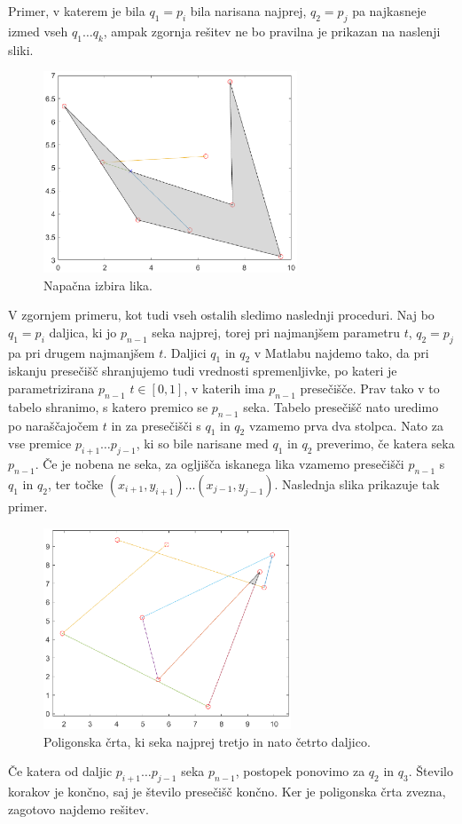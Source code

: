 \documentclass{article}
\begin{document}
Primer, v katerem je bila $q_1 = p_i$ bila narisana najprej, $q_2 = p_j$ pa najkasneje izmed vseh $q_1 \dots q_k$, ampak 
zgornja rešitev ne bo pravilna je prikazan na naslenji sliki.
\begin{figure}[H]
    \centering
        \includegraphics[height = 6cm]{tocke_v_testu.eps}
        \caption{Napačna izbira lika.}
\end{figure}

V zgornjem primeru, kot tudi vseh ostalih sledimo naslednji proceduri.
Naj bo $q_1 = p_i$ daljica, ki jo $p_{n-1}$ seka najprej, torej pri najmanjšem parametru $t$,
$q_2 = p_j$ pa pri drugem najmanjšem $t$. Daljici $q_1$ in $q_2$ v Matlabu najdemo tako, da pri iskanju presečišč
shranjujemo tudi vrednosti spremenljivke, po kateri je parametrizirana $p_{n-1}$ $t \in [0, 1]$, v katerih ima $p_{n-1}$ 
presečišče. Prav tako v to tabelo shranimo, s katero premico se $p_{n-1}$ seka. Tabelo presečišč nato uredimo po 
naraščajočem $t$ in za presečišči s $q_1$ in $q_2$ vzamemo prva dva stolpca. Nato za vse premice $p_{i+1} \dots p_{j-1}$, ki so 
bile narisane med $q_1$ in $q_2$ preverimo, če katera seka $p_{n-1}$. Če je nobena ne seka, za ogljišča iskanega lika vzamemo
presečišči $p_{n-1}$ s $q_1$ in $q_2$, ter točke $(x_{i+1}, y_{i+1}) \dots (x_{j-1}, y_{j-1})$. Naslednja slika prikazuje 
tak primer.
\begin{figure}[H]
    \centering
        \includegraphics[height = 6cm]{zaporednje_q.eps}
        \caption{Poligonska črta, ki seka najprej tretjo in nato četrto daljico.}
\end{figure}
Če katera od daljic $p_{i+1} \dots p_{j-1}$ seka $p_{n-1}$, postopek ponovimo za $q_2$ in $q_3$. Število korakov je 
končno, saj je število presečišč končno. Ker je poligonska črta zvezna, zagotovo najdemo rešitev.
\end{document}
